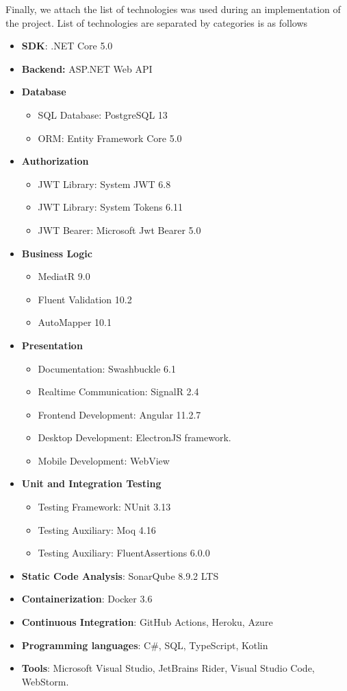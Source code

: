 Finally, we attach the list of technologies was used during an implementation of the project.
List of technologies are separated by categories is as follows
\begin{itemize}
    \item \textbf{SDK}: .NET Core 5.0
    \item \textbf{Backend:} ASP.NET Web API
    \item \textbf{Database}
    \begin{itemize}
        \item SQL Database: PostgreSQL 13
        \item ORM: Entity Framework Core 5.0
    \end{itemize}
    \item \textbf{Authorization}
    \begin{itemize}
        \item JWT Library: System JWT 6.8
        \item JWT Library: System Tokens 6.11
        \item JWT Bearer: Microsoft Jwt Bearer 5.0
    \end{itemize}
    \item \textbf{Business Logic}
    \begin{itemize}
        \item MediatR 9.0
        \item Fluent Validation 10.2
        \item AutoMapper 10.1
    \end{itemize}
    \item \textbf{Presentation}
    \begin{itemize}
        \item Documentation: Swashbuckle 6.1
        \item Realtime Communication: SignalR 2.4
        \item Frontend Development: Angular 11.2.7
        \item Desktop Development: ElectronJS framework.
        \item Mobile Development: WebView
    \end{itemize}
    \item \textbf{Unit and Integration Testing}
    \begin{itemize}
        \item Testing Framework: NUnit 3.13
        \item Testing Auxiliary: Moq 4.16
        \item Testing Auxiliary: FluentAssertions 6.0.0
    \end{itemize}
    \item \textbf{Static Code Analysis}: SonarQube 8.9.2 LTS
    \item \textbf{Containerization}: Docker 3.6
    \item \textbf{Continuous Integration}: GitHub Actions, Heroku, Azure
    \item \textbf{Programming languages}: C\#, SQL, TypeScript, Kotlin
    \item \textbf{Tools}: Microsoft Visual Studio, JetBrains Rider, Visual Studio Code, WebStorm.
\end{itemize}